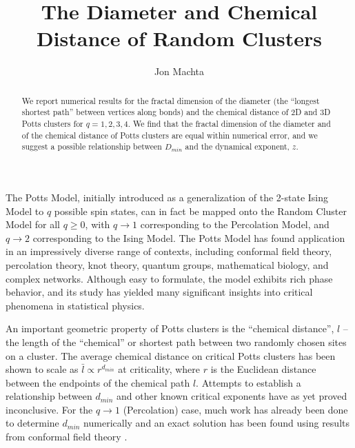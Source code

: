 \documentclass[aps, preprint, groupedaddress]{revtex4-1}
\begin{document}
\title{The Diameter and Chemical Distance of Random Clusters}



\author{Jon Machta}
\begin{abstract}

We report numerical results for the fractal dimension of the diameter (the ``longest shortest path'' between vertices along bonds) and the chemical distance of 2D and 3D Potts clusters for $q=1,2,3,4$.  We find that the fractal dimension of the diameter and of the chemical distance of Potts clusters are equal within numerical error, and we suggest a possible relationship between $D_{min}$ and the dynamical exponent, $z$. 

\end{abstract}                  

\maketitle


The Potts Model, initially introduced as a generalization of the 2-state Ising Model to $q$ possible spin states, can in fact be mapped onto the Random Cluster Model for all $q \ge 0$, with $q \to 1$ corresponding to the Percolation Model, and $q \to 2$ corresponding to the Ising Model.  The Potts Model has found application in an impressively diverse range of contexts, including conformal field theory, percolation theory, knot theory, quantum groups, mathematical biology, and complex networks. Although easy to formulate, the model exhibits rich phase behavior, and its study has yielded many significant insights into critical phenomena in statistical physics.

An important geometric property of Potts clusters is the ``chemical distance'', $l$ -- the length of the ``chemical'' or shortest path between two randomly chosen sites on a cluster.  The average chemical distance on critical Potts clusters has been shown to scale as $\bar{l} \propto r^{d_{min}}$ at criticality, where $r$ is the Euclidean distance between the endpoints of the chemical path $l$. Attempts to establish a relationship between $d_{min}$ and other known critical exponents have as yet proved inconclusive.  For the $q \to 1$ (Percolation) case, much work has already been done to determine $d_{min}$ numerically \cite{Gr83, HrSt88} and an exact solution has been found using results from conformal field theory \cite{Zi99}.
\end{document}
